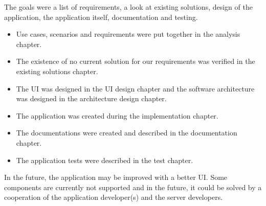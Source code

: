 % 

The goals were a list of requirements, a look at existing solutions, design of the application, the application itself, documentation and testing.

\begin{itemize}
    \item Use cases, scenarios and requirements were put together in the analysis chapter.
    \item The existence of no current solution for our requirements was verified in the existing solutions chapter.
    \item The UI was designed in the UI design chapter and the software architecture was designed in the architecture design chapter.
    \item The application was created during the implementation chapter.
    \item The documentations were created and described in the documentation chapter.
    \item The application tests were described in the test chapter.
\end{itemize}

In the future, the application may be improved with a better UI.
Some components are currently not supported and in the future, it could be solved by a cooperation of the application developer(s) and the server developers.